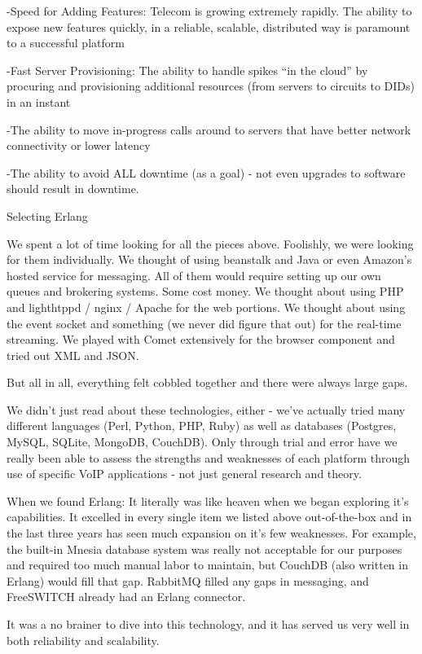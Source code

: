 -Speed for Adding Features: Telecom is growing extremely rapidly. The ability to expose new features quickly, in a reliable, scalable, distributed way is paramount to a successful platform

-Fast Server Provisioning: The ability to handle spikes “in the cloud” by procuring and provisioning additional resources (from servers to circuits to DIDs) in an instant

-The ability to move in-progress calls around to servers that have better network connectivity or lower latency

-The ability to avoid ALL downtime (as a goal) - not even upgrades to software should result in downtime.

Selecting Erlang

We spent a lot of time looking for all the pieces above. Foolishly, we were looking for them individually. We thought of using beanstalk and Java or even Amazon’s hosted service for messaging. All of them would require setting up our own queues and brokering systems. Some cost money. We thought about using PHP and lighthtppd / nginx / Apache for the web portions. We thought about using the event socket and something (we never did figure that out) for the real-time streaming. We played with Comet extensively for the browser component and tried out XML and JSON.

But all in all, everything felt cobbled together and there were always large gaps.

We didn’t just read about these technologies, either - we’ve actually tried many different languages (Perl, Python, PHP, Ruby) as well as databases (Postgres, MySQL, SQLite, MongoDB, CouchDB). Only through trial and error have we really been able to assess the strengths and weaknesses of each platform through use of specific VoIP applications - not just general research and theory.

When we found Erlang: It literally was like heaven when we began exploring it’s capabilities. It excelled in every single item we listed above out-of-the-box and in the last three years has seen much expansion on it’s few weaknesses. For example, the built-in Mnesia database system was really not acceptable for our purposes and required too much manual labor to maintain, but CouchDB (also written in Erlang) would fill that gap. RabbitMQ filled any gaps in messaging, and FreeSWITCH already had an Erlang connector. 

It was a no brainer to dive into this technology, and it has served us very well in both reliability and scalability.

